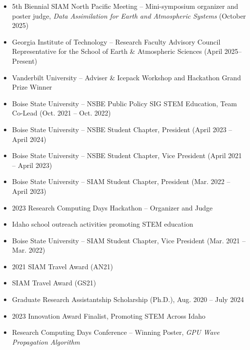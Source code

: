 \documentclass[11pt]{article}
\begin{document}
\begin{itemize}[leftmargin=1.2em, itemsep=2pt, topsep=2pt]

\item 5th Biennial SIAM North Pacific Meeting -- Mini-symposium organizer and poster judge, \textit{Data Assimilation for Earth and Atmospheric Systems} (October 2025)

\item Georgia Institute of Technology -- Research Faculty Advisory Council Representative for the School of Earth \& Atmospheric Sciences (April 2025--Present)

\item Vanderbilt University -- Adviser \& Icepack Workshop and Hackathon Grand Prize Winner

\item Boise State University -- NSBE Public Policy SIG STEM Education, Team Co-Lead (Oct. 2021 -- Oct. 2022)

\item Boise State University -- NSBE Student Chapter, President (April 2023 -- April 2024)

\item Boise State University -- NSBE Student Chapter, Vice President (April 2021 -- April 2023)

\item Boise State University -- SIAM Student Chapter, President (Mar. 2022 -- April 2023)

\item 2023 Research Computing Days Hackathon -- Organizer and Judge

\item Idaho school outreach activities promoting STEM education

\item Boise State University -- SIAM Student Chapter, Vice President (Mar. 2021 -- Mar. 2022)

\item 2021 SIAM Travel Award (AN21)

\item SIAM Travel Award (GS21)

\item Graduate Research Assistantship Scholarship (Ph.D.), Aug. 2020 -- July 2024

\item 2023 Innovation Award Finalist, Promoting STEM Across Idaho

\item Research Computing Days Conference -- Winning Poster, \textit{GPU Wave Propagation Algorithm}


\end{itemize}
\end{document}

